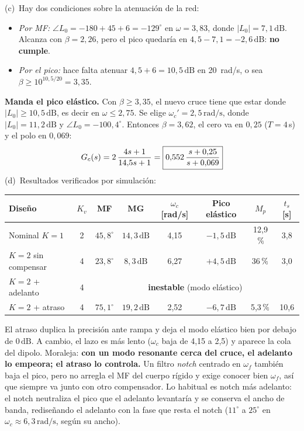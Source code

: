 \documentclass[11pt,a4paper]{article}
\newcommand{\rta}[1]{\fbox{$\displaystyle #1$}}
\newcommand{\pct}{\ensuremath{\,\mathchar"7025}}
\newcommand{\dB}{\,\mathrm{dB}}
\newcommand{\rads}{\,\mathrm{rad/s}}
\newcommand{\wc}{\omega_c}
\begin{document}
(c)~Hay dos condiciones sobre la atenuación de la red:
\begin{itemize}
\item \emph{Por MF:} $\angle L_0=-180+45+6=-129^\circ$ en $\omega=3{,}83$, donde $|L_0|=7{,}1\dB$. Alcanza con $\beta=2{,}26$, pero el pico quedaría en
      $4{,}5-7{,}1=-2{,}6\dB$: \textbf{no cumple}.
\item \emph{Por el pico:} hace falta atenuar $4{,}5+6=10{,}5\dB$ en 20~rad/s, o sea $\beta\ge10^{10{,}5/20}=3{,}35$.
\end{itemize}
\textbf{Manda el pico elástico.} Con $\beta\ge3{,}35$, el nuevo cruce tiene que estar donde $|L_0|\ge10{,}5\dB$, es decir en $\omega\le2{,}75$.
Se elige $\wc'=2{,}5\rads$, donde $|L_0|=11{,}2\dB$ y $\angle L_0=-100{,}4^\circ$. Entonces $\beta=3{,}62$, el cero va en $0{,}25$ ($T=4$\,s) y el polo en $0{,}069$:
\[
G_c(s)=2\,\frac{4s+1}{14{,}5s+1}=\rta{0{,}552\,\frac{s+0{,}25}{s+0{,}069}}
\]
(d)~Resultados verificados por simulación:
\begin{center}
\small
\begin{tabular}{@{}lccccccc@{}}
\toprule
Diseño & $K_v$ & MF & MG & $\wc$ [rad/s] & Pico elástico & $M_p$ & $t_s$ [s]\\
\midrule
Nominal $K=1$ & 2 & $45{,}8^\circ$ & $14{,}3\dB$ & 4,15 & $-1{,}5\dB$ & 12,9\pct{} & 3,8\\
$K=2$ sin compensar & 4 & $23{,}8^\circ$ & $8{,}3\dB$ & 6,27 & $+4{,}5\dB$ & 36\pct{} & 3,0\\
$K=2$ + adelanto & 4 & \multicolumn{6}{c}{\textbf{inestable} (modo elástico)}\\
$K=2$ + atraso & 4 & $75{,}1^\circ$ & $19{,}2\dB$ & 2,52 & $-6{,}7\dB$ & 5,3\pct{} & 10,6\\
\bottomrule
\end{tabular}
\end{center}
El atraso duplica la precisión ante rampa y deja el modo elástico bien por debajo de $0\dB$. A cambio, el lazo es más lento
($\wc$ baja de 4,15 a 2,5) y aparece la cola del dipolo. Moraleja: \textbf{con un modo resonante cerca del cruce, el adelanto lo empeora;
el atraso lo controla.} Un filtro \emph{notch} centrado en $\omega_f$ también baja el pico, pero no arregla el MF del cuerpo rígido y exige conocer bien $\omega_f$, así que
siempre va junto con otro compensador. Lo habitual es notch más adelanto: el notch neutraliza el pico que el adelanto levantaría y se conserva el ancho
de banda, rediseñando el adelanto con la fase que resta el notch ($11^\circ$ a $25^\circ$ en $\wc\approx6{,}3\rads$, según su ancho).
\end{document}
